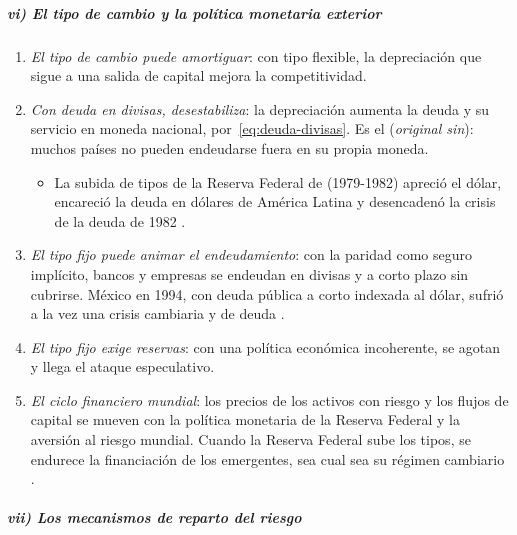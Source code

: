 \documentclass[11pt]{article}
\begin{document}
\subparagraph{vi) El tipo de cambio y la política monetaria exterior}

\begin{enumerate}
\item \emph{El tipo de cambio puede amortiguar}: con tipo flexible, la depreciación que sigue a una salida de capital mejora la competitividad.
\item \emph{Con deuda en divisas, desestabiliza}: la depreciación aumenta la deuda y su servicio en moneda nacional, por~\eqref{eq:deuda-divisas}. Es el  (\emph{original sin}): muchos países no pueden endeudarse fuera en su propia moneda\nocite{EichengreenHausmann1999,EHP2005PecadoOriginal}.
  \begin{itemize}
  \item La subida de tipos de la Reserva Federal de  (1979-1982) apreció el dólar, encareció la deuda en dólares de América Latina y desencadenó la crisis de la deuda de 1982 .
  \end{itemize}
\item \emph{El tipo fijo puede animar el endeudamiento}: con la paridad como seguro implícito, bancos y empresas se endeudan en divisas y a corto plazo sin cubrirse. México en 1994, con deuda pública a corto indexada al dólar, sufrió a la vez una crisis cambiaria y de deuda .
\item \emph{El tipo fijo exige reservas}: con una política económica incoherente, se agotan y llega el ataque especulativo\nocite{Krugman1979Model}.
\item \emph{El ciclo financiero mundial}: los precios de los activos con riesgo y los flujos de capital se mueven con la política monetaria de la Reserva Federal y la aversión al riesgo mundial. Cuando la Reserva Federal sube los tipos, se endurece la financiación de los emergentes, sea cual sea su régimen cambiario\nocite{Rey2013Dilema} .
\end{enumerate}

\subparagraph{vii) Los mecanismos de reparto del riesgo}
\end{document}
